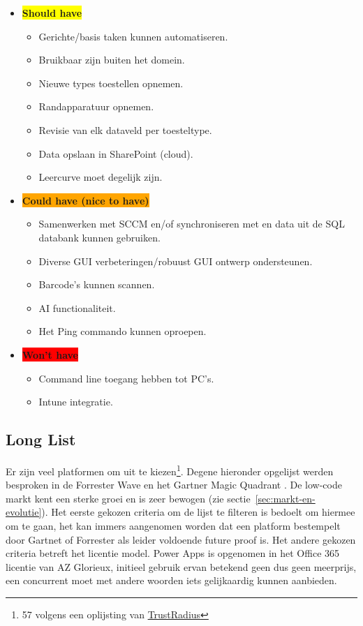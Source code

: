 \begin{itemize}
\begin{itemize}
    \end{itemize}
    \item \textbf{\colorbox{yellow}{Should have}}
    \begin{itemize}
        \item Gerichte/basis taken kunnen automatiseren.
        \item Bruikbaar zijn buiten het domein.
        \item Nieuwe types toestellen opnemen.
        \item Randapparatuur opnemen.
        \item Revisie van elk dataveld per toesteltype.
        \item Data opslaan in SharePoint (cloud).
        \item Leercurve moet degelijk zijn.
    \end{itemize}
    \item \textbf{\colorbox{orange}{Could have (nice to have)}}
    \begin{itemize}
        \item Samenwerken met SCCM en/of synchroniseren met en data uit de SQL databank kunnen gebruiken.
        \item Diverse GUI verbeteringen/robuust GUI ontwerp ondersteunen.
        \item Barcode's kunnen scannen.
        \item AI functionaliteit.
        \item Het Ping commando kunnen oproepen.
    \end{itemize}
    \item \textbf{\colorbox{red}{Won't have}}
    \begin{itemize}
        \item Command line toegang hebben tot PC's.
        \item Intune integratie.
    \end{itemize}
\end{itemize}

\subsection{Long List}

Er zijn veel platformen om uit te kiezen\footnote{ 57 volgens een oplijsting van \href{https://www.trustradius.com/low-code-development}{TrustRadius}}. Degene hieronder opgelijst werden besproken in de Forrester Wave \autocite{Rymer2019} en het Gartner Magic Quadrant \autocite{Vincent2019}. De low-code markt kent een sterke groei en is zeer bewogen (zie sectie~\ref{sec:markt-en-evolutie}). Het eerste gekozen criteria om de lijst te filteren is bedoelt om hiermee om te gaan, het kan immers aangenomen worden dat een platform bestempelt door Gartnet of Forrester als leider voldoende future proof is. Het andere gekozen criteria betreft het licentie model. Power Apps is opgenomen in het Office 365 licentie van AZ Glorieux, initieel gebruik ervan betekend geen dus geen meerprijs, een concurrent moet met andere woorden iets gelijkaardig kunnen aanbieden.

